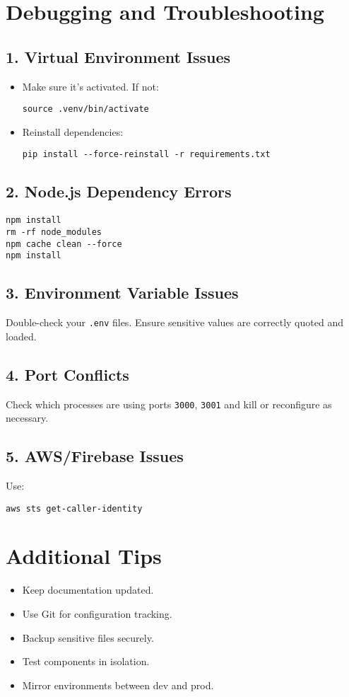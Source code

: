 \documentclass{article}
\begin{document}
\section{Debugging and Troubleshooting}

\subsection*{1. Virtual Environment Issues}
\begin{itemize}
    \item Make sure it's activated. If not:
\begin{Verbatim}[fontsize=\small]
source .venv/bin/activate
\end{Verbatim}
    \item Reinstall dependencies:
\begin{Verbatim}[fontsize=\small]
pip install --force-reinstall -r requirements.txt
\end{Verbatim}
\end{itemize}

\subsection*{2. Node.js Dependency Errors}
\begin{Verbatim}[fontsize=\small]
npm install
rm -rf node_modules
npm cache clean --force
npm install
\end{Verbatim}

\subsection*{3. Environment Variable Issues}
Double-check your \texttt{.env} files. Ensure sensitive values are correctly quoted and loaded.

\subsection*{4. Port Conflicts}
Check which processes are using ports \texttt{3000}, \texttt{3001} and kill or reconfigure as necessary.

\subsection*{5. AWS/Firebase Issues}
Use:
\begin{Verbatim}[fontsize=\small]
aws sts get-caller-identity
\end{Verbatim}

\section{Additional Tips}
\begin{itemize}
    \item Keep documentation updated.
    \item Use Git for configuration tracking.
    \item Backup sensitive files securely.
    \item Test components in isolation.
    \item Mirror environments between dev and prod.
\end{itemize}
\end{document}
